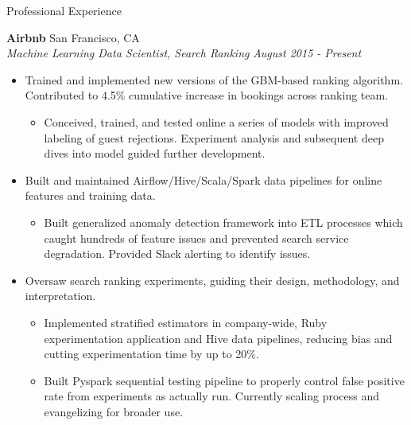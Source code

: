 \documentclass{resume} %
\begin{document}
\begin{rSection}{Professional Experience}

\vspace{0.2em}

{\bf Airbnb} \hfill San Francisco, CA \\
{\em Machine Learning Data Scientist, Search Ranking} \hfill {\em August 2015 - Present} \vspace{0.3em} 
\vspace{-0.2em}
\begin{itemize} \itemsep -0.2em
    \item Trained and implemented new versions of the GBM-based ranking algorithm. Contributed to 4.5\% cumulative increase in bookings across ranking team.
        \vspace{-0.2em}
        \begin{itemize} \itemsep -0.2em
            \item Conceived, trained, and tested online a series of models with improved labeling of guest rejections. Experiment analysis and subsequent deep dives into model guided further development.
        \end{itemize}
    \item Built and maintained Airflow/Hive/Scala/Spark data pipelines for online features and training data.
        \vspace{-0.2em}
        \begin{itemize} \itemsep -0.2em
            \item Built generalized anomaly detection framework into ETL processes which caught hundreds of feature issues and prevented search service degradation. Provided Slack alerting to identify issues.
        \end{itemize}
    \item Oversaw search ranking experiments, guiding their design, methodology, and interpretation.
        \vspace{-0.2em}
        \begin{itemize} \itemsep -0.2em
            \item Implemented stratified estimators in company-wide, Ruby experimentation application and Hive data pipelines, reducing bias and cutting experimentation time by up to 20\%.
            \item Built Pyspark sequential testing pipeline to properly control false positive rate from experiments as actually run. Currently scaling process and evangelizing for broader use.

\end{itemize}
\end{itemize}
\end{rSection}
\end{document}
